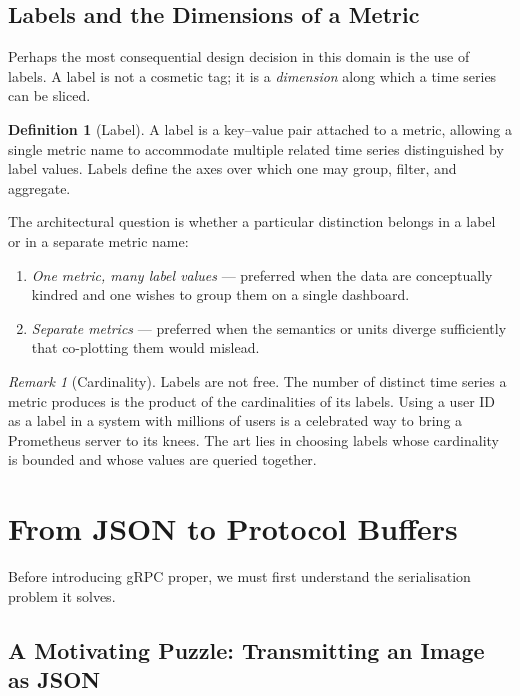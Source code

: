 \documentclass[11pt,a4paper]{article}
\theoremstyle{definition}
\newtheorem{definition}{Definition}[section]
\theoremstyle{remark}
\newtheorem*{remark}{Remark}
\begin{document}
\subsection{Labels and the Dimensions of a Metric}

Perhaps the most consequential design decision in this domain is the use of labels. A label is not a cosmetic tag; it is a \emph{dimension} along which a time series can be sliced.

\begin{definition}[Label]
A label is a key--value pair attached to a metric, allowing a single metric name to accommodate multiple related time series distinguished by label values. Labels define the axes over which one may group, filter, and aggregate.
\end{definition}

The architectural question is whether a particular distinction belongs in a label or in a separate metric name:
\begin{enumerate}
    \item \emph{One metric, many label values} --- preferred when the data are conceptually kindred and one wishes to group them on a single dashboard.
    \item \emph{Separate metrics} --- preferred when the semantics or units diverge sufficiently that co-plotting them would mislead.
\end{enumerate}

\begin{remark}[Cardinality]
Labels are not free. The number of distinct time series a metric produces is the product of the cardinalities of its labels. Using a user ID as a label in a system with millions of users is a celebrated way to bring a Prometheus server to its knees. The art lies in choosing labels whose cardinality is bounded and whose values are queried together.
\end{remark}

\section{From JSON to Protocol Buffers}


Before introducing gRPC proper, we must first understand the serialisation problem it solves.

\subsection{A Motivating Puzzle: Transmitting an Image as JSON}
\end{document}
